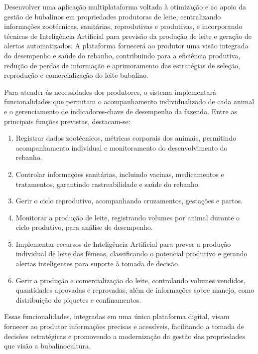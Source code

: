 Desenvolver uma aplicação multiplataforma voltada à otimização e ao apoio da gestão de bubalinos em propriedades produtoras de leite, centralizando informações zootécnicas, sanitárias, reprodutivas e produtivas, e incorporando técnicas de Inteligência Artificial para previsão da produção de leite e geração de alertas automatizados. A plataforma fornecerá ao produtor uma visão integrada do desempenho e saúde do rebanho, contribuindo para a eficiência produtiva, redução de perdas de informação e aprimoramento das estratégias de seleção, reprodução e comercialização do leite bubalino.

Para atender às necessidades dos produtores, o sistema implementará funcionalidades que permitam o acompanhamento individualizado de cada animal e o gerenciamento de indicadores-chave de desempenho da fazenda. Entre as principais funções previstas, destacam-se:

\begin{enumerate}
    \item Registrar dados zootécnicos, métricas corporais dos animais, permitindo acompanhamento individual e monitoramento do desenvolvimento do rebanho.
    \item Controlar informações sanitárias, incluindo vacinas, medicamentos e tratamentos, garantindo rastreabilidade e saúde do rebanho.
    \item Gerir o ciclo reprodutivo, acompanhando cruzamentos, gestações e partos.
    \item Monitorar a produção de leite, registrando volumes por animal durante o ciclo produtivo, para análise de desempenho.
    \item Implementar recursos de Inteligência Artificial para prever a produção individual de leite das fêmeas, classificando o potencial produtivo e gerando alertas inteligentes para suporte à tomada de decisão.
    \item Gerir a produção e comercialização do leite, controlando volumes vendidos, quantidades aprovadas e reprovadas, além de informações sobre manejo, como distribuição de piquetes e confinamentos.
\end{enumerate}


Essas funcionalidades, integradas em uma única plataforma digital, visam fornecer ao produtor informações precisas e acessíveis, facilitando a tomada de decisões estratégicas e promovendo a modernização da gestão das propriedades que visão a bubalinocultura.